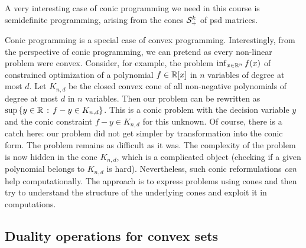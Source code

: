 A very interesting case of conic programming we need in this course is semidefinite programming, arising from the cones $\mathcal{S}_+^k$ of psd matrices. 

Conic programming is a special case of convex programming. Interestingly, from the perspective of conic programming, we can pretend as every non-linear problem were convex. Consider, for example, the problem $\inf_{x \in \mathbb{R}^n} f(x)$ of constrained optimization of a polynomial $f \in \mathbb{R}[x]$ in $n$ variables of degree at most $d$. Let $K_{n,d}$ be the closed convex cone of all non-negative polynomials of degree at most $d$ in $n$ variables. Then our problem can be rewritten as $\sup \left\{ y \in \mathbb{R} \,:\, f - y \in K_{n,d} \right\}$. This is a conic problem with the decision variable $y$ and the conic constraint $f - y \in K_{n,d}$ for this unknown. Of course, there is a catch here: our problem did not get simpler by transformation into the conic form. The problem remains as difficult as it was. The complexity of the problem is now hidden in the cone $K_{n,d}$, which is a complicated object (checking if a given polynomial belongs to $K_{n,d}$ is hard). Nevertheless, such conic reformulations \emph{can} help computationally. The approach is to express problems using cones and then try to understand the structure of the underlying cones and exploit it in computations. 


\subsection{Duality operations for convex sets}

